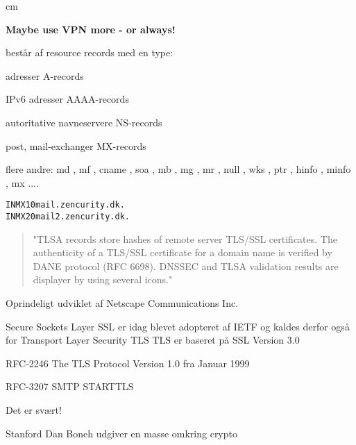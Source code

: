 \documentclass[Screen16to9,17pt]{foils}
\begin{document}
 cm
\centerline{\bf\Large Maybe use VPN more - or always!}






\begin{list1}
  \item består af resource records med en type:
    \begin{list2}
\item adresser A-records
\item IPv6 adresser AAAA-records
\item autoritative navneservere NS-records
\item post, mail-exchanger MX-records
\item flere andre: md ,  mf ,  cname ,  soa ,
                  mb , mg ,  mr ,  null ,  wks ,  ptr ,
                  hinfo ,  minfo ,  mx ....
\end{list2}
\end{list1}
\begin{alltt}
        IN      MX      10      mail.zencurity.dk.
        IN      MX      20      mail2.zencurity.dk.
\end{alltt}







\begin{quote}
"TLSA records store hashes of remote server TLS/SSL certificates. The authenticity of a TLS/SSL certificate for a domain name is verified by DANE protocol (RFC 6698). DNSSEC and TLSA validation results are displayer by using several icons."
\end{quote}





\begin{list1}
\item Oprindeligt udviklet af Netscape Communications Inc.
\item Secure Sockets Layer SSL er idag blevet adopteret af IETF og kaldes
derfor også for Transport Layer Security TLS
TLS er baseret på SSL Version 3.0
\item RFC-2246 The TLS Protocol Version 1.0 fra Januar 1999
\item RFC-3207 SMTP STARTTLS
\item Det er svært!
\item Stanford Dan Boneh udgiver en masse omkring crypto\\ 
\end{list1}
\end{document}
